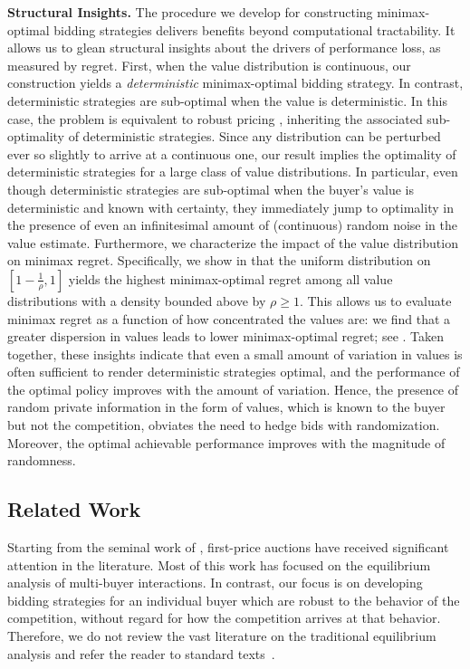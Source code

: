 \textbf{Structural Insights.} The procedure we develop for constructing minimax-optimal bidding strategies delivers benefits beyond computational tractability. It allows us to glean structural insights about the drivers of performance loss, as measured by regret. First, when the value distribution is continuous, our construction yields a \emph{deterministic} minimax-optimal bidding strategy. In contrast, deterministic strategies are sub-optimal when the value is deterministic. In this case, the problem is equivalent to robust pricing \citep{bergemann2011robust}, inheriting the associated sub-optimality of deterministic strategies. Since any distribution can be perturbed ever so slightly to arrive at a continuous one, our result implies the optimality of deterministic strategies for a large class of value distributions. In particular, even though deterministic strategies are sub-optimal when the buyer's value is deterministic and known with certainty, they immediately jump to optimality in the presence of even an infinitesimal amount of (continuous) random noise in the value estimate. Furthermore, we characterize the impact of the value distribution on minimax regret. Specifically, we show in  that the uniform distribution on $[1 - \tfrac{1}{\rho}, 1]$ yields the highest minimax-optimal regret among all value distributions with a density bounded above by $\rho \geq 1$. This allows us to evaluate minimax regret as a function of how concentrated the values are: we find that a greater dispersion in values leads to lower minimax-optimal regret; see . Taken together, these insights indicate that even a small amount of variation in values is often sufficient to render deterministic strategies optimal, and the performance of the optimal policy improves with the amount of variation. Hence, the presence of random private information in the form of values, which is known to the buyer but not the competition, obviates the need to hedge bids with randomization. Moreover, the optimal achievable performance improves with the magnitude of randomness.




\subsection{Related Work}

Starting from the seminal work of \citet{vickrey1961counterspeculation}, first-price auctions have received significant attention in the literature. Most of this work has focused on the equilibrium analysis of multi-buyer interactions. In contrast, our focus is on developing bidding strategies for an individual buyer which are robust to the behavior of the competition, without regard for how the competition arrives at that behavior. Therefore, we do not review the vast literature on the traditional equilibrium analysis and refer the reader to standard texts~\citep{krishna2009auction, milgrom2004putting}.

